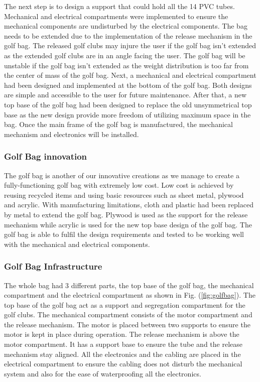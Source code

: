 \documentclass[11pt,landscape]{article}
\begin{document}
\begin{multicols}{3}
    The next step is to design a support that could hold all the 14 PVC tubes.
    Mechanical and electrical compartments were implemented to ensure the
    mechanical components are undisturbed by the electrical components. The
    bag needs to be extended due to the implementation of the release mechanism
    in the golf bag. The released golf clubs may injure the user if the golf bag
    isn’t extended as the extended golf clubs are in an angle facing the user.
    The golf bag will be unstable if the golf bag isn’t extended as the weight
    distribution is too far from the center of mass of the golf bag. Next, a
    mechanical and electrical compartment had been designed and implemented at
    the bottom of the golf bag. Both designs are simple and accessible to the
    user for future maintenance. After that, a new top base of the golf bag had
    been designed to replace the old unsymmetrical top base as the new design
    provide more freedom of utilizing maximum space in the bag. Once the main
    frame of the golf bag is manufactured, the mechanical mechanism and
    electronics will be installed. 
    
    
    \subsubsection{Golf Bag innovation}
    The golf bag is another of our innovative creations as we manage to
    create a fully-functioning golf bag with extremely low cost. Low cost is
    achieved by reusing recycled items and using basic resources such as sheet metal,
    plywood and acrylic. With manufacturing limitations, cloth and plastic had been
    replaced by metal to extend the golf bag. Plywood is used as the support for
    the release mechanism while acrylic is used for the new top base design of
    the golf bag. The golf bag is able to fulfil the design requirements and
    tested to be working well with the mechanical and electrical components.
    
    \subsubsection{Golf Bag Infrastructure}
    The whole bag had 3 different parts, the top base of the golf bag, the
    mechanical compartment and the electrical compartment as shown in Fig.
    (\ref{fig:golfbag}). The top base of the golf bag act as a support and
    segregation compartment for the golf clubs. The mechanical compartment
    consists of the motor compartment and the release mechanism. The motor is
    placed between two supports to ensure the motor is kept in place during
    operation. The release mechanism is above the motor compartment. It has a
    support base to ensure the tube and the release mechanism stay aligned. All
    the electronics and the cabling are placed in the electrical compartment to
    ensure the cabling does not disturb the mechanical system and also for the
    ease of waterproofing all the electronics.
    

\end{multicols}
\end{document}
